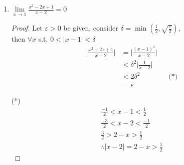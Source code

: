 \documentclass[12pt]{article}
\begin{document}
\begin{enumerate}
\begin{enumerate}
\begin{proof}
            (*)
            \begin{gather*}
                -1 < x-3 < 1 \\
                1 < x-1 < 3 \\
                \therefore |x-1| = x-1 > 1
            \end{gather*}
        \end{proof}
        \item $\lim\limits_{x \to 1} \frac{x^2-2x+1}{x-2} = 0$
        \begin{proof}
            Let $\varepsilon > 0$ be given, consider $\delta = \min(\frac{1}{2}, \sqrt{\frac{\varepsilon}{2}}) $, \\
            then $\forall x$ s.t. $0 < |x-1| < \delta$
            \begin{align*}
                \bigg| \frac{x^2-2x+1}{x-2} \bigg| &= \bigg| \frac{{(x-1)}^2}{x-2} \bigg| \\
                &< \delta^2 \bigg| \frac{1}{x-2} \bigg| \\
                &< 2\delta^2 && \text{(*)} \\
                &= \varepsilon
            \end{align*}

            (*)
            \begin{gather*}
                \frac{-1}{2} < x-1 < \frac{1}{2} \\
                \frac{-3}{2} < x-2 < \frac{-1}{2} \\
                \frac{3}{2} > 2-x > \frac{1}{2} \\
                \therefore |x-2| = 2-x > \frac{1}{2}
            \end{gather*}
        \end{proof}
    \end{enumerate}
\end{enumerate}
\end{document}
